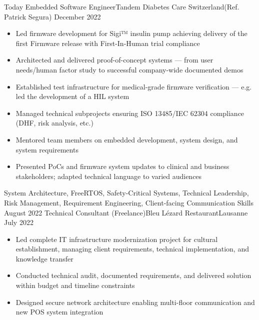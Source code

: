 %
%
%
\begin{experiences}
  \experience
    {Today}   {Embedded Software Engineer}{Tandem Diabetes Care Switzerland}{(Ref. Patrick Segura)}
    {December 2022} {
                      \begin{itemize}
                       \item Led firmware development for Sigi™ insulin pump achieving delivery of the first Firmware release with First-In-Human trial compliance
\item Architected and delivered proof-of-concept systems — from user needs/human factor study to successful company-wide documented demos
\item Established test infrastructure for medical-grade firmware verification — e.g. led the development of a HIL system
\item Managed technical subprojects ensuring ISO 13485/IEC 62304 compliance (DHF, risk analysis, etc.)
\item Mentored team members on embedded development, system design,  and system requirements
\item Presented PoCs and firmware system updates to clinical and business stakeholders; adapted technical language to varied audiences
                      \end{itemize}
                    }
                {System Architecture, FreeRTOS, Safety-Critical Systems, Technical Leadership, Risk Management, Requirement Engineering, Client-facing Communication Skills}
  \emptySeparator
  \experience
    {August 2022}   {Technical Consultant (Freelance)}{Bleu Lézard Restaurant}{Lausanne}
    {July 2022} {
                      \begin{itemize}
                        \item Led complete IT infrastructure modernization project for cultural establishment, managing client requirements, technical implementation, and knowledge transfer
                        \item Conducted technical audit, documented requirements, and delivered solution within budget and timeline constraints
                        \item Designed secure network architecture enabling multi-floor communication and new POS system integration

\end{itemize}}
\end{experiences}
